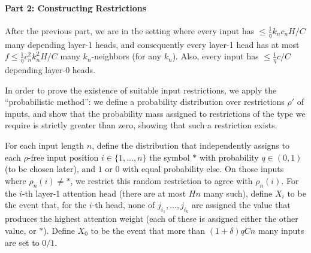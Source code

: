 \documentclass[11pt,a4paper]{article}
\begin{document}
\paragraph{Part 2: Constructing Restrictions}
After the previous part, we are in the setting where every input has $\leq \frac{1}{\eta}k_nc_nH/C$ many depending layer-1 heads, and consequently every layer-1 head has at most $f \leq \frac{1}{\eta}c_n^2k_n^2H/C$ many $k_n$-neighbors (for any $k_n$).
Also, every input has $\leq \frac{1}{\eta}c/C$ depending layer-0 heads.


In order to prove the existence of suitable input restrictions, we apply the ``probabilistic method'': we define a probability distribution over restrictions $\rho'$ of inputs, and show that the probability mass assigned to restrictions of the type we require is strictly greater than zero, showing that such a restriction exists.

For each input length $n$, define the distribution that independently assigns to each $\rho$-free input position $i \in \{1, \dots, n\}$ the symbol $*$ with probability $q \in (0,1)$ (to be chosen later), and $1$ or $0$ with equal probability else.
On those inputs where $\rho_n(i) \neq *$, we restrict this random restriction to agree with $\rho_n(i)$.
For the $i$-th layer-1 attention head (there are at most $Hn$ many such), define $X_i$ to be the event that, for the $i$-th head, none of $j_{i_1}, \dots, j_{i_k}$ are assigned the value that produces the highest attention weight (each of these is assigned either the other value, or $*$).
Define $X_0$ to be the event that more than $(1+\delta)qCn$ many inputs are set to $0/1$.
\end{document}
